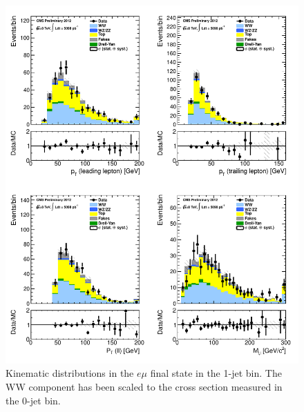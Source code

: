 \begin{figure}[!hbtp]
\centering
\includegraphics[width=1\textwidth]{figures/ww_analysis20_0_ALL_em_1j.pdf} %
\caption{Kinematic distributions in the $e\mu$ final state in the 1-jet bin.
The WW component has been scaled to the cross section measured in the 0-jet bin.}
\label{fig:xs_kinematics_em_1j}
\end{figure}
